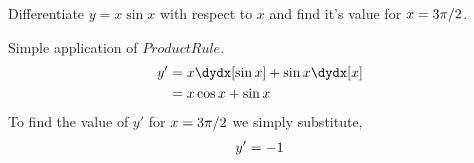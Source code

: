 

\question Differentiate $y=x\sin x$ with respect to $x$ and 
find it's value for $x=3\pi/2$.

\insertQR{}

\watchout

\begin{solution}
  Simple application of $Product Rule$.
  \begin{align}
    y' &= x \dydx[\sin x] + \sin x\dydx[x] \\
       &= x\cos x + \sin x
  \end{align}
  To find the value of $y'$ for $x=3\pi/2$ we simply substitute,
  \begin{align}
    y'= -1
  \end{align}
\end{solution}

